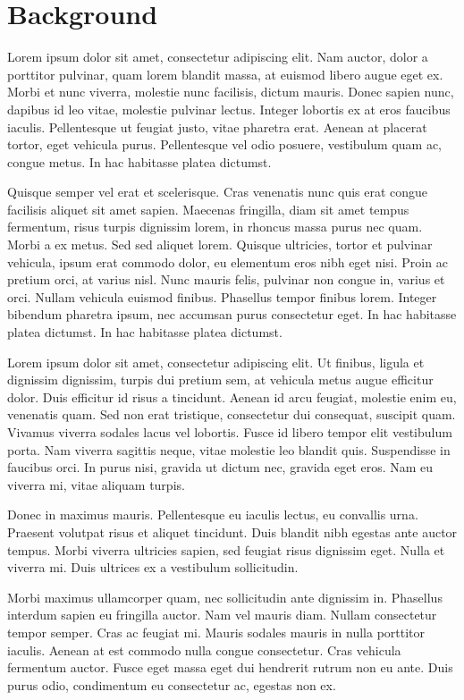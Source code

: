 \documentclass[12pt]{article}
\begin{document}
\section{Background 
\label{sec:background}}

Lorem ipsum dolor sit amet, consectetur adipiscing elit. Nam auctor, dolor a porttitor pulvinar, quam lorem blandit massa, at euismod libero augue eget ex. Morbi et nunc viverra, molestie nunc facilisis, dictum mauris. Donec sapien nunc, dapibus id leo vitae, molestie pulvinar lectus. Integer lobortis ex at eros faucibus iaculis. Pellentesque ut feugiat justo, vitae pharetra erat. Aenean at placerat tortor, eget vehicula purus. Pellentesque vel odio posuere, vestibulum quam ac, congue metus. In hac habitasse platea dictumst.

Quisque semper vel erat et scelerisque. Cras venenatis nunc quis erat congue facilisis aliquet sit amet sapien. Maecenas fringilla, diam sit amet tempus fermentum, risus turpis dignissim lorem, in rhoncus massa purus nec quam. Morbi a ex metus. Sed sed aliquet lorem. Quisque ultricies, tortor et pulvinar vehicula, ipsum erat commodo dolor, eu elementum eros nibh eget nisi. Proin ac pretium orci, at varius nisl. Nunc mauris felis, pulvinar non congue in, varius et orci. Nullam vehicula euismod finibus. Phasellus tempor finibus lorem. Integer bibendum pharetra ipsum, nec accumsan purus consectetur eget. In hac habitasse platea dictumst. In hac habitasse platea dictumst.

Lorem ipsum dolor sit amet, consectetur adipiscing elit. Ut finibus, ligula et dignissim dignissim, turpis dui pretium sem, at vehicula metus augue efficitur dolor. Duis efficitur id risus a tincidunt. Aenean id arcu feugiat, molestie enim eu, venenatis quam. Sed non erat tristique, consectetur dui consequat, suscipit quam. Vivamus viverra sodales lacus vel lobortis. Fusce id libero tempor elit vestibulum porta. Nam viverra sagittis neque, vitae molestie leo blandit quis. Suspendisse in faucibus orci. In purus nisi, gravida ut dictum nec, gravida eget eros. Nam eu viverra mi, vitae aliquam turpis.

Donec in maximus mauris. Pellentesque eu iaculis lectus, eu convallis urna. Praesent volutpat risus et aliquet tincidunt. Duis blandit nibh egestas ante auctor tempus. Morbi viverra ultricies sapien, sed feugiat risus dignissim eget. Nulla et viverra mi. Duis ultrices ex a vestibulum sollicitudin.

Morbi maximus ullamcorper quam, nec sollicitudin ante dignissim in. Phasellus interdum sapien eu fringilla auctor. Nam vel mauris diam. Nullam consectetur tempor semper. Cras ac feugiat mi. Mauris sodales mauris in nulla porttitor iaculis. Aenean at est commodo nulla congue consectetur. Cras vehicula fermentum auctor. Fusce eget massa eget dui hendrerit rutrum non eu ante. Duis purus odio, condimentum eu consectetur ac, egestas non ex.
\end{document}
